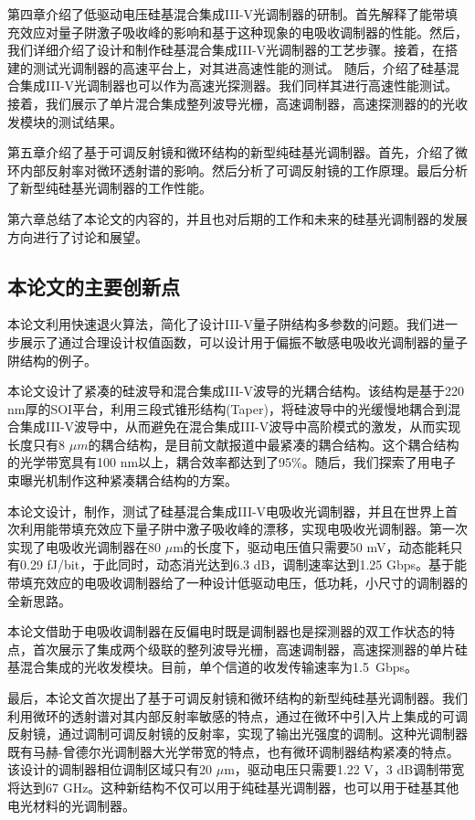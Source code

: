 第四章介绍了低驱动电压硅基混合集成III-V光调制器的研制。首先解释了能带填充效应对量子阱激子吸收峰的影响和基于这种现象的电吸收调制器的性能。然后，我们详细介绍了设计和制作硅基混合集成III-V光调制器的工艺步骤。接着，在搭建的测试光调制器的高速平台上，对其进高速性能的测试。 随后，介绍了硅基混合集成III-V光调制器也可以作为高速光探测器。我们同样其进行高速性能测试。接着，我们展示了单片混合集成整列波导光栅，高速调制器，高速探测器的的光收发模块的测试结果。

第五章介绍了基于可调反射镜和微环结构的新型纯硅基光调制器。首先，介绍了微环内部反射率对微环透射谱的影响。然后分析了可调反射镜的工作原理。最后分析了新型纯硅基光调制器的工作性能。

第六章总结了本论文的内容的，并且也对后期的工作和未来的硅基光调制器的发展方向进行了讨论和展望。

\subsection{本论文的主要创新点}
本论文利用快速退火算法，简化了设计III-V量子阱结构多参数的问题。我们进一步展示了通过合理设计权值函数，可以设计用于偏振不敏感电吸收光调制器的量子阱结构的例子。

本论文设计了紧凑的硅波导和混合集成III-V波导的光耦合结构。该结构是基于220 nm厚的SOI平台，利用三段式锥形结构(Taper)，将硅波导中的光缓慢地耦合到混合集成III-V波导中，从而避免在混合集成III-V波导中高阶模式的激发，从而实现长度只有8 $\mu m$的耦合结构，是目前文献报道中最紧凑的耦合结构。这个耦合结构的光学带宽具有100 nm以上，耦合效率都达到了95\%。随后，我们探索了用电子束曝光机制作这种紧凑耦合结构的方案。

本论文设计，制作，测试了硅基混合集成III-V电吸收光调制器，并且在世界上首次利用能带填充效应下量子阱中激子吸收峰的漂移，实现电吸收光调制器。第一次实现了电吸收光调制器在80  $\mu$m的长度下，驱动电压值只需要50 mV，动态能耗只有0.29 fJ/bit，于此同时，动态消光达到6.3 dB，调制速率达到1.25 Gbps。基于能带填充效应的电吸收调制器给了一种设计低驱动电压，低功耗，小尺寸的调制器的全新思路。

本论文借助于电吸收调制器在反偏电时既是调制器也是探测器的双工作状态的特点，首次展示了集成两个级联的整列波导光栅，高速调制器，高速探测器的单片硅基混合集成的光收发模块。目前，单个信道的收发传输速率为1.5~Gbps。 

最后，本论文首次提出了基于可调反射镜和微环结构的新型纯硅基光调制器。我们利用微环的透射谱对其内部反射率敏感的特点，通过在微环中引入片上集成的可调反射镜，通过调制可调反射镜的反射率，实现了输出光强度的调制。这种光调制器既有马赫-曾德尔光调制器大光学带宽的特点，也有微环调制器结构紧凑的特点。该设计的调制器相位调制区域只有20 $\mu$m，驱动电压只需要1.22 V，3 dB调制带宽将达到67 GHz。这种新结构不仅可以用于纯硅基光调制器，也可以用于硅基其他电光材料的光调制器。




